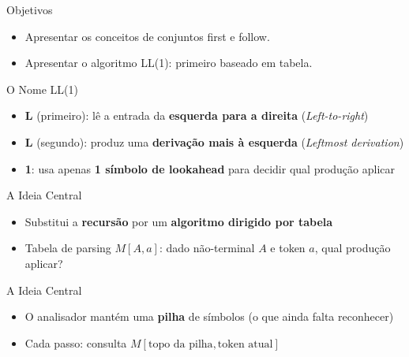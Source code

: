 \subtitle{\bf Aula 8 - O Algoritmo LL(1)}
\begin{frame}[t,plain]
    \titlepage
\end{frame}

\begin{frame}{Objetivos}

    \begin{itemize}
        \item
        Apresentar os conceitos de conjuntos first e follow.
        \item
        Apresentar o algoritmo LL(1): primeiro baseado em tabela.
    \end{itemize}
\end{frame}



\begin{frame}{O Nome LL(1)}

    \begin{itemize}

        \item
        \textbf{L} (primeiro): lê a entrada da \textbf{esquerda para a
        direita} (\emph{Left-to-right})
        \item
        \textbf{L} (segundo): produz uma \textbf{derivação mais à esquerda}
        (\emph{Leftmost derivation})
        \item
        \textbf{1}: usa apenas \textbf{1 símbolo de lookahead} para decidir
        qual produção aplicar
    \end{itemize}
\end{frame}

\begin{frame}{A Ideia Central}

    \begin{itemize}

        \item
        Substitui a \textbf{recursão} por um \textbf{algoritmo dirigido por
        tabela}
        \item
        Tabela de parsing \(M[A, a]\): dado não-terminal \(A\) e token \(a\),
        qual produção aplicar?
    \end{itemize}
\end{frame}

\begin{frame}{A Ideia Central}

    \begin{itemize}

        \item
        O analisador mantém uma \textbf{pilha} de símbolos (o que ainda falta
        reconhecer)
        \item
        Cada passo: consulta \(M[\text{topo da pilha}, \text{token atual}]\)
    \end{itemize}
\end{frame}

